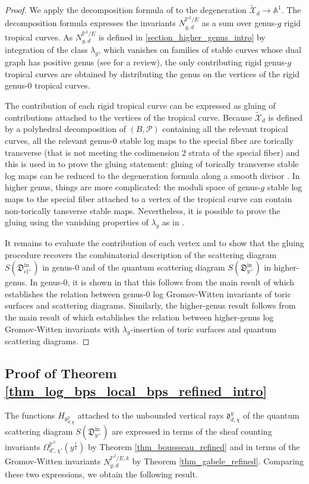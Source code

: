 \documentclass[11pt,letterpaper]{amsart}
\newcommand\A{\mathbb A}
\newcommand\PP{\mathbb P}
\newcommand\cX{\mathcal X}
\newcommand\fd{\mathfrak d}
\newcommand\fD{\mathfrak D}
\newcommand\cl{\operatorname{cl}}
\newcommand\iin{\mathrm{in}}
\begin{document}
\begin{proof}
We apply the decomposition formula of 
\cite{abramovich2017decomposition} to the degeneration $\tilde{\cX}_d \rightarrow \A^1$. The decomposition formula expresses the invariants 
$N_{g,d}^{\PP^2/E}$ as a sum over genus-$g$ rigid tropical curves.
As $N_{g,d}^{\PP^2/E}$ is defined in 
\cref{section_higher_genus_intro} by integration of the class $\lambda_g$, which vanishes on families of stable curves whose dual graph has positive genus (see
\cite[\S 3]{MR3904449} for a review), the only contributing rigid genus-$g$ tropical curves are obtained by distributing the genus on the vertices of the rigid genus-$0$ tropical curves.

The contribution of each rigid tropical curve can be expressed as gluing of contributions attached to the vertices of the tropical curve. Because $\tilde{\cX}_d$ is defined by a polyhedral decomposition
of $(B, \mathscr{P})$  
containing all the relevant 
tropical curves, all the relevant genus-$0$
stable log maps to the special fiber are torically transverse (that is not meeting the codimension $2$ strata of the special fiber) and this is used in
\cite{gabele2019tropical} to prove the gluing statement: gluing of torically transverse stable log maps can be reduced to the degeneration formula along a smooth divisor \cite{kim2018degeneration}.
In higher genus, things are more complicated: the moduli space of genus-$g$ stable log maps to the special fiber attached to a vertex of the tropical curve can contain non-torically tansverse stable maps. Nevertheless, it is possible to prove the gluing using the vanishing properties of $\lambda_g$ as in 
\cite[\S 6-7]{MR3904449}.

It remains to evaluate the contribution of each vertex and to show that the gluing procedure recovers the combinatorial description of the scattering diagram 
$S(\fD^{\iin}_{\cl^+})$ in genus-$0$ and of the quantum scattering diagram 
$S(\fD^{\iin}_{y^+})$
in higher-genus. In genus-$0$, it is shown in \cite{gabele2019tropical} that this follows from the main result of 
\cite{MR2667135} which establishes the relation between genus-$0$ log Gromov-Witten invariants of toric surfaces and scattering diagrams. Similarly, the higher-genus result follows from the main result of 
\cite{bousseau2018quantum_tropical} which establishes the relation between higher-genus log Gromov-Witten invariants with 
$\lambda_g$-insertion of toric surfaces and quantum scattering diagrams.
\end{proof}


\subsection{Proof of Theorem \ref{thm_log_bps_local_bps_refined_intro}}
\label{section_proof_thm_log_bps_local_bps_refined_intro}
The functions $H_{\fd_{d,\chi}^y}$ attached to the unbounded vertical rays
$\fd_{d,\chi}^y$ of the quantum scattering diagram  $S(\fD^\iin_{y^+})$ are expressed in terms of the sheaf counting invariants $\Omega_{d',\chi'}^{\PP^2}(y^{\frac{1}{2}})$ by Theorem 
\ref{thm_boussseau_refined} and in terms of the Gromov-Witten invariants 
$N_{g,d}^{\PP^2/E,k}$ by Theorem \ref{thm_gabele_refined}. Comparing these two expressions, we obtain the following result.
\end{document}
